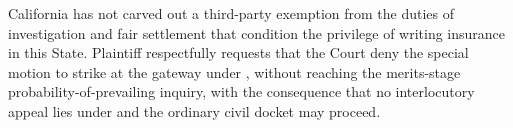 California has not carved out a third-party exemption from the duties of investigation and fair settlement that condition the privilege of writing insurance in this State. Plaintiff respectfully requests that the Court deny the special motion to strike at the gateway under , without reaching the merits-stage probability-of-prevailing inquiry, with the consequence that no interlocutory appeal lies under  and the ordinary civil docket may proceed.



